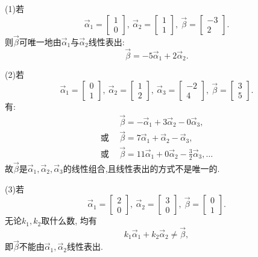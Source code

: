 \begin{eg}
(1)若$$\vec{\alpha}_1=\begin{bmatrix}1\\0\end{bmatrix},\ \vec{\alpha}_2=\begin{bmatrix}1\\1\end{bmatrix},\ \vec{\beta}=\begin{bmatrix}-3\\2\end{bmatrix}.$$
则$\vec{\beta}$可唯一地由$\vec{\alpha}_1$与$\vec{\alpha}_2$线性表出:$$\vec{\beta}=-5\vec{\alpha}_1+2\vec{\alpha}_2.$$

(2)若$$\vec{\alpha}_1=\begin{bmatrix}0\\1\end{bmatrix},\ \vec{\alpha}_2=\begin{bmatrix}1\\2\end{bmatrix},\
\vec{\alpha}_3=\begin{bmatrix}-2\\4\end{bmatrix},\
\vec{\beta}=\begin{bmatrix}3\\5\end{bmatrix}.$$
有:
\begin{displaymath}\begin{aligned}
&\vec{\beta}=-\vec{\alpha}_1+3\vec{\alpha}_2-0\vec{\alpha}_3,\\
\mbox{或}\ \ &\vec{\beta}=7\vec{\alpha}_1+\vec{\alpha}_2-\vec{\alpha}_3,\\
\mbox{或}\ \ &\vec{\beta}=11\vec{\alpha}_1+0\vec{\alpha}_2-\frac{3}{2}\vec{\alpha}_3,\dots
\end{aligned}\end{displaymath}
故$\vec{\beta}$是$\vec{\alpha}_1,\vec{\alpha}_2,\vec{\alpha}_3$的线性组合,且线性表出的方式不是唯一的.

(3)若$$\vec{\alpha}_1=\begin{bmatrix}2\\0\end{bmatrix},\ \vec{\alpha}_2=\begin{bmatrix}3\\0\end{bmatrix},\ \vec{\beta}=\begin{bmatrix}0\\1\end{bmatrix}.$$
无论$k_1,k_2$取什么数, 均有$$k_1\vec{\alpha}_1+k_2\vec{\alpha}_2\not=\vec{\beta},$$
即$\vec{\beta}$不能由$\vec{\alpha}_1,\vec{\alpha}_2$线性表出.

\end{eg}

